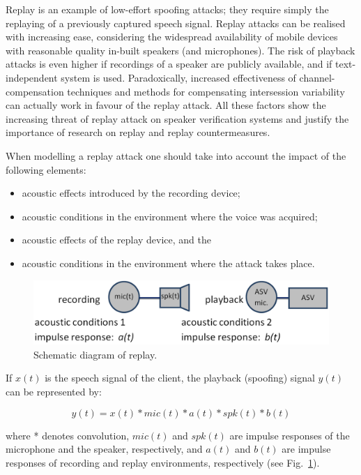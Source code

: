 
Replay is an example of low-effort spoofing attacks; they require simply the replaying of a previously captured speech signal. Replay attacks can be realised with increasing ease, considering the widespread availability of mobile devices with reasonable quality in-built speakers (and microphones). The risk of playback attacks is even higher if recordings of a speaker are publicly available, and if text-independent system is used. Paradoxically, increased effectiveness of channel-compensation techniques and methods for compensating intersession variability can actually work in favour of the replay attack. All these factors show the increasing threat of replay attack on speaker verification systems and justify the importance of research on replay and replay countermeasures.

When modelling a replay attack one should take into account the impact of the following elements:
\begin{itemize}
\item acoustic effects introduced by the recording device;
\item acoustic conditions in the environment where the voice was acquired;
\item acoustic effects of the replay device, and the
\item acoustic conditions in the environment where the attack takes place. 
\end{itemize}

\begin{figure}
	\includegraphics[width=1\linewidth]{Figs/replay.png}

	\caption{Schematic diagram of replay.}
	\label{fig::Replay}
\end{figure}


If $x(t)$ is the speech signal of the client, the playback (spoofing) signal $y(t)$ can be represented by:

\begin{equation}
y(t) = x(t)* mic(t) * a(t) * spk(t) * b(t)
\label{eq::playback}
\end{equation}

where * denotes convolution, $mic(t)$ and $spk(t)$ are impulse responses of the microphone and the speaker, respectively, and $a(t)$ and $b(t)$ are impulse responses of recording and replay environments, respectively (see Fig.~\ref{fig::Replay}). 

